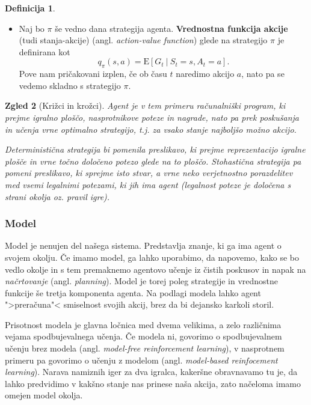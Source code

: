 \documentclass[12pt,a4paper]{amsart}
\theoremstyle{definition} %
\newtheorem{definicija}{Definicija}[section]
\theoremstyle{plain} %
\newtheorem{zgled}[definicija]{Zgled}
\begin{document}
\begin{definicija}
\begin{itemize}
        \item Naj bo $\pi$ še vedno dana strategija agenta. \textbf{Vrednostna funkcija 
                akcije} (tudi stanja-akcije) (angl. \textit{action-value function}) glede na 
                strategijo $\pi$ je definirana kot
                $$
                q_\pi(s, a) = \mathrm{E} [G_t~|~S_t = s, A_t = a].
                $$
                Pove nam pričakovani izplen, če ob času $t$ naredimo akcijo $a$, nato pa se 
                vedemo skladno s strategijo $\pi$.
    \end{itemize}
\end{definicija}

\begin{zgled}[Križci in krožci]
    Agent je v tem primeru računalniški program, ki prejme igralno ploščo, nasprotnikove 
    poteze in nagrade, nato pa prek poskušanja in učenja vrne optimalno strategijo, t.j. 
    za vsako stanje najboljšo možno akcijo.

    Deterministična strategija bi pomenila preslikavo, ki prejme reprezentacijo igralne plošče
    in vrne točno določeno potezo glede na to ploščo. Stohastična strategija pa pomeni preslikavo, 
    ki sprejme isto stvar, a vrne neko verjetnostno porazdelitev med vsemi legalnimi potezami, 
    ki jih ima agent (legalnost poteze je določena s strani okolja oz. pravil igre).
\end{zgled}

\subsubsection{Model}
Model je nenujen del našega sistema. Predstavlja znanje, ki ga ima agent o svojem okolju. 
Če imamo model, ga lahko uporabimo, da napovemo, kako se bo vedlo okolje in s tem premaknemo
agentovo učenje iz čistih poskusov in napak na \textit{načrtovanje} (angl. \textit{planning}).
Model je torej poleg strategije in vrednostne funkcije še tretja komponenta agenta. Na podlagi 
modela lahko agent ">preračuna"< smiselnost svojih akcij, brez da bi dejansko karkoli storil. 

Prisotnost modela je glavna ločnica med dvema velikima, a zelo različnima vejama spodbujevalnega
učenja. Če modela ni, govorimo o spodbujevalnem učenju brez modela (angl. \textit{model-free 
reinforcement learning}), v nasprotnem primeru pa govorimo o učenju z modelom (angl. \textit
{model-based reinfocement learning}). Narava namiznih iger za dva igralca, kakeršne obravnavamo tu
je, da lahko predvidimo v kakšno stanje nas prinese naša akcija, zato načeloma imamo omejen model 
okolja.
\end{document}
